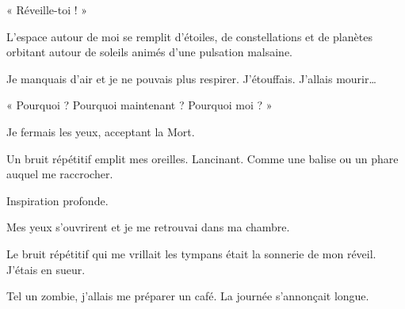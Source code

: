 « Réveille-toi ! »

L'espace autour de moi se remplit d'étoiles, de constellations et de planètes orbitant autour de soleils animés d'une 
pulsation malsaine.

Je manquais d'air et je ne pouvais plus respirer. J'étouffais. J'allais mourir…

« Pourquoi ? Pourquoi maintenant ? Pourquoi moi ? »

Je fermais les yeux, acceptant la Mort.

Un bruit répétitif emplit mes oreilles. Lancinant. Comme une balise ou un phare auquel me raccrocher.

Inspiration profonde.

Mes yeux s'ouvrirent et je me retrouvai dans ma chambre.

Le bruit répétitif qui me vrillait les tympans était la sonnerie de mon réveil. J'étais en sueur.

Tel un zombie, j'allais me préparer un café. La journée s'annonçait longue.
